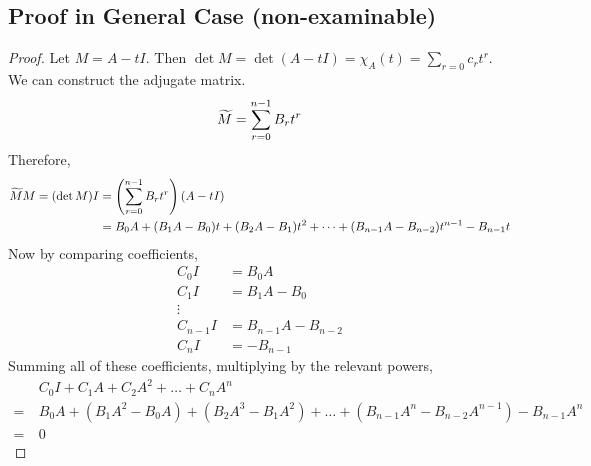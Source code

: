 \subsection{Proof in General Case (non-examinable)}
\begin{proof}
	Let \(M = A - tI\).
	Then \(\det M = \det(A - tI) = \chi_A(t) = \sum_{r=0}c_r t^r\).
	We can construct the adjugate matrix.
	\[
		\widetilde{M} = \sum_{r=0}^{n-1} B_r t^r
	\]
	Therefore,
	\begin{align*}
		\widetilde{M} M = (\det M) I & = \left(\sum_{r=0}^{n-1} B_r t^r\right)(A-tI)                                             \\
		                           & = B_0A + (B_1A - B_0)t + (B_2A - B_1)t^2 + \dots + (B_{n-1}A - B_{n-2})t^{n-1} - B_{n-1}t
	\end{align*}
	Now by comparing coefficients,
	\begin{align*}
		C_0I     & = B_0A               \\
		C_1I     & = B_1A - B_0         \\
		\vdots                          \\
		C_{n-1}I & = B_{n-1}A - B_{n-2} \\
		C_n I    & = -B_{n-1}
	\end{align*}
	Summing all of these coefficients, multiplying by the relevant powers,
	\begin{align*}
		 & C_0I + C_1A + C_2A^2 + \dots + C_n A^n \\=\ &B_0A + (B_1A^2 - B_0A) + (B_2A^3 - B_1A^2) + \dots + (B_{n-1}A^n - B_{n-2}A^{n-1}) - B_{n-1}A^n \\=\ &0
	\end{align*}
\end{proof}

